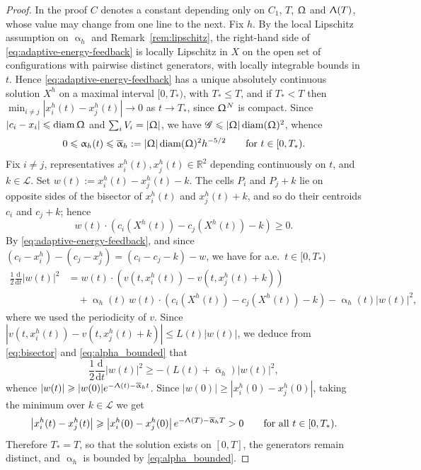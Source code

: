 \documentclass[letterpaper,11pt,twoside]{article}
\numberwithin{figure}{section}
\numberwithin{table}{section}
\theoremstyle{cpamplain}
\theoremstyle{cpamdefinition}
\newcommand{\R}{\mathbb{R}}
\newcommand{\diff}{\mathrm{d}}
\let\alpha\upalpha
\let\Lambda\Uplambda
\let\Omega\Upomega
\renewcommand{\le}{\leqslant}
\renewcommand{\ge}{\geqslant}
\numberwithin{equation}{section}
\begin{document}
\begin{proof}
In the proof $C$ denotes a constant depending only on $C_1$, $T$, $\Omega$ and $\Lambda(T)$, whose value may change from one line to the next.
Fix $h$.
By the local Lipschitz assumption on $\alpha_h$ and Remark~\ref{rem:lipschitz}, the right-hand side of \eqref{eq:adaptive-energy-feedback} is locally Lipschitz in $X$ on the open set of configurations with pairwise distinct generators, with locally integrable bounds in $t$.
Hence \eqref{eq:adaptive-energy-feedback} has a unique absolutely continuous solution $X^h$ on a maximal interval $[0,T_\ast)$, with $T_\ast\le T$, and if $T_\ast<T$ then $\min_{i\ne j}|x_i^h(t)-x_j^h(t)|\to0$ as $t\to T_\ast$, since $\Omega^N$ is compact.
Since $|c_i-x_i|\le\operatorname{diam}\Omega$ and $\sum_iV_i=|\Omega|$, we have $\mathscr G\le|\Omega|\operatorname{diam}(\Omega)^2$, whence
\begin{equation}\label{eq:alpha_bounded}
0\le\alpha_h(t)\le\overline\alpha_h:=|\Omega|\operatorname{diam}(\Omega)^2h^{-5/2}
\qquad\text{for }t\in[0,T_\ast).
\end{equation}
Fix $i\ne j$, representatives $x_i^h(t),x_j^h(t)\in\R^2$ depending continuously on $t$, and $k\in\mathcal L$.
Set $w(t):=x_i^h(t)-x_j^h(t)-k$.
The cells $P_i$ and $P_j+k$ lie on opposite sides of the bisector of $x_i^h(t)$ and $x_j^h(t)+k$, and so do their centroids $c_i$ and $c_j+k$; hence
\begin{equation}\label{eq:bisector}
w(t)\cdot\left(c_i(X^h(t))-c_j(X^h(t))-k\right)\ge0 .
\end{equation}
By \eqref{eq:adaptive-energy-feedback}, and since $(c_i-x_i^h)-(c_j-x_j^h)=(c_i-c_j-k)-w$, we have for a.e.\ $t\in[0,T_\ast)$
\begin{align*}
\frac12\frac{\diff}{\diff t}|w(t)|^2
&=w(t)\cdot\left(v(t,x_i^h(t))-v(t,x_j^h(t)+k)\right)\\
&\quad+\alpha_h(t)\,w(t)\cdot\left(c_i(X^h(t))-c_j(X^h(t))-k\right)
-\alpha_h(t)|w(t)|^2,
\end{align*}
where we used the periodicity of $v$.
Since $|v(t,x_i^h(t))-v(t,x_j^h(t)+k)|\le L(t)|w(t)|$, we deduce from \eqref{eq:bisector} and \eqref{eq:alpha_bounded} that
\[
\frac12\frac{\diff}{\diff t}|w(t)|^2\ge-\left(L(t)+\overline\alpha_h\right)|w(t)|^2,
\]
whence $|w(t)|\ge|w(0)|e^{-\Lambda(t)-\overline\alpha_ht}$. Since $|w(0)|\ge|x_i^h(0)-x_j^h(0)|$, taking the minimum over $k\in\mathcal L$ we get
\[
\left|x_i^h(t)-x_j^h(t)\right|\ge\left|x_i^h(0)-x_j^h(0)\right|e^{-\Lambda(T)-\overline\alpha_hT}>0
\qquad\text{for all }t\in[0,T_\ast).
\]
Therefore $T_\ast=T$, so that the solution exists on $[0,T]$, the generators remain distinct, and $\alpha_h$ is bounded by \eqref{eq:alpha_bounded}.


\end{proof}
\end{document}
